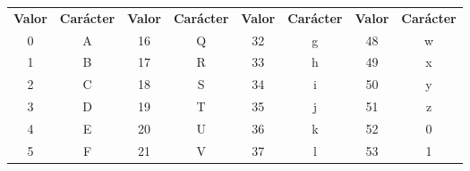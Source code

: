 \documentclass[titlepage,a4paper]{article}
\begin{document}
\begin{table}[H]
\centering
\begin{tabular}{cc|cc|cc|cc}
\rowcolor[HTML]{EAECF0} 
{\color[HTML]{202122} \textbf{Valor}} & {\color[HTML]{202122} \textbf{Carácter}} & {\color[HTML]{202122} \textbf{Valor}} & {\color[HTML]{202122} \textbf{Carácter}} & {\color[HTML]{202122} \textbf{Valor}} & {\color[HTML]{202122} \textbf{Carácter}} & {\color[HTML]{202122} \textbf{Valor}} & {\color[HTML]{202122} \textbf{Carácter}} \\
\rowcolor[HTML]{F8F9FA} 
{\color[HTML]{202122} 0}              & {\color[HTML]{202122} A}                 & {\color[HTML]{202122} 16}             & {\color[HTML]{202122} Q}                 & {\color[HTML]{202122} 32}             & {\color[HTML]{202122} g}                 & {\color[HTML]{202122} 48}             & {\color[HTML]{202122} w}                 \\
\rowcolor[HTML]{F8F9FA} 
{\color[HTML]{202122} 1}              & {\color[HTML]{202122} B}                 & {\color[HTML]{202122} 17}             & {\color[HTML]{202122} R}                 & {\color[HTML]{202122} 33}             & {\color[HTML]{202122} h}                 & {\color[HTML]{202122} 49}             & {\color[HTML]{202122} x}                 \\
\rowcolor[HTML]{F8F9FA} 
{\color[HTML]{202122} 2}              & {\color[HTML]{202122} C}                 & {\color[HTML]{202122} 18}             & {\color[HTML]{202122} S}                 & {\color[HTML]{202122} 34}             & {\color[HTML]{202122} i}                 & {\color[HTML]{202122} 50}             & {\color[HTML]{202122} y}                 \\
\rowcolor[HTML]{F8F9FA} 
{\color[HTML]{202122} 3}              & {\color[HTML]{202122} D}                 & {\color[HTML]{202122} 19}             & {\color[HTML]{202122} T}                 & {\color[HTML]{202122} 35}             & {\color[HTML]{202122} j}                 & {\color[HTML]{202122} 51}             & {\color[HTML]{202122} z}                 \\
\rowcolor[HTML]{F8F9FA} 
{\color[HTML]{202122} 4}              & {\color[HTML]{202122} E}                 & {\color[HTML]{202122} 20}             & {\color[HTML]{202122} U}                 & {\color[HTML]{202122} 36}             & {\color[HTML]{202122} k}                 & {\color[HTML]{202122} 52}             & {\color[HTML]{202122} 0}                 \\
\rowcolor[HTML]{F8F9FA} 
{\color[HTML]{202122} 5}              & {\color[HTML]{202122} F}                 & {\color[HTML]{202122} 21}             & {\color[HTML]{202122} V}                 & {\color[HTML]{202122} 37}             & {\color[HTML]{202122} l}                 & {\color[HTML]{202122} 53}             & {\color[HTML]{202122} 1}                 \\

\end{tabular}
\end{table}
\end{document}
